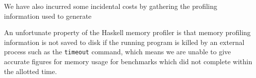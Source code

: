 
We have also incurred some incidental costs by gathering the profiling information used to generate 








An unfortunate property of the Haskell memory profiler is that memory profiling information is not saved to disk if the running program is killed by an external process such as the \texttt{timeout} command, which means we are unable to give accurate figures for memory usage for benchmarks which did not complete within the allotted time.


